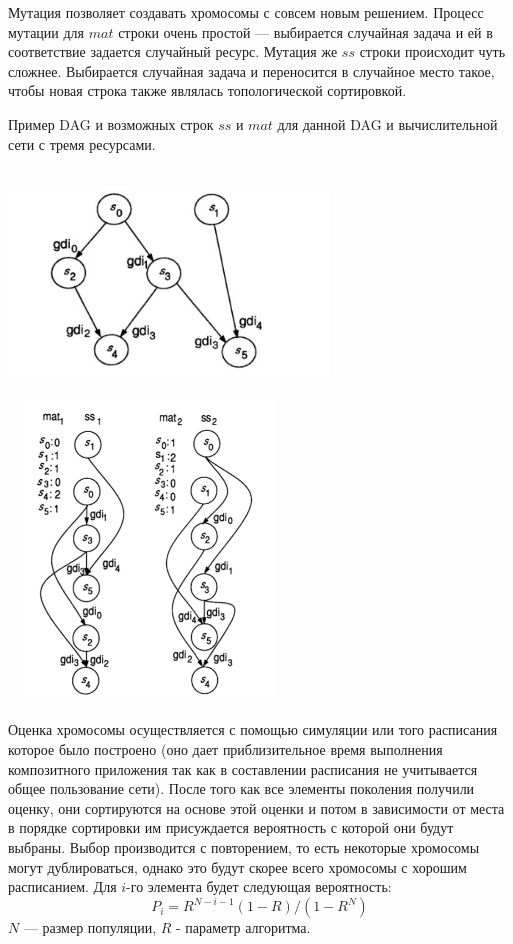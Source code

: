 \begin{spacing}{1.3}
Мутация позволяет создавать хромосомы с совсем новым решением. Процесс мутации для $mat$ строки очень простой --- выбирается случайная задача и ей в соответствие задается случайный ресурс. Мутация же $ss$ строки происходит чуть сложнее. Выбирается случайная задача и переносится в случайное место такое, чтобы новая строка также являлась топологической сортировкой.

Пример DAG и возможных строк $ss$ и $mat$ для данной DAG и вычислительной сети с тремя ресурсами.

\includegraphics[width=85mm,height=60mm]{dag_example}
\includegraphics[width=75mm,height=80mm]{ss_mat_ex}

Оценка хромосомы осуществляется с помощью симуляции или того расписания которое было построено (оно дает приблизительное время выполнения композитного приложения так как в составлении расписания не учитывается общее пользование сети). После того как все элементы поколения получили оценку, они сортируются на основе этой оценки и потом в зависимости от места в порядке сортировки им присуждается вероятность с которой они будут выбраны. Выбор производится с повторением, то есть некоторые хромосомы могут дублироваться, однако это будут скорее всего хромосомы с хорошим расписанием. Для $i$-го элемента будет следующая вероятность: 
$$
P_i = R^{N - i - 1} (1 - R) / (1 - R^N)
$$
$N$ --- размер популяции, $R$ - параметр алгоритма.


\end{spacing}
